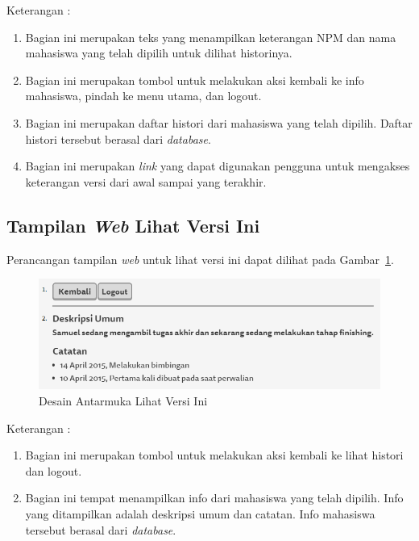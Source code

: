 Keterangan :
\begin{enumerate}[(1)]
\item
Bagian ini merupakan teks yang menampilkan keterangan NPM dan nama mahasiswa yang telah dipilih untuk dilihat historinya.
\item
Bagian ini merupakan tombol untuk melakukan aksi kembali ke info mahasiswa, pindah ke menu utama, dan logout.
\item
Bagian ini merupakan daftar histori dari mahasiswa yang telah dipilih. Daftar histori tersebut berasal dari {\it database}.
\item
Bagian ini merupakan {\it link} yang dapat digunakan pengguna untuk mengakses keterangan versi dari awal sampai yang terakhir.
\end{enumerate}

\subsection{Tampilan {\it Web} Lihat Versi Ini}
Perancangan tampilan {\it web} untuk lihat versi ini dapat dilihat pada
Gambar~\ref{fig:lihatversiini}.
\begin{figure}[ht]
\centering
\includegraphics[scale=0.8]{Gambar/lihatversiini.png}
\caption[Desain Antarmuka Lihat Versi Ini]{Desain Antarmuka Lihat Versi Ini}
\label{fig:lihatversiini}
\end{figure}

Keterangan :
\begin{enumerate}[(1)]
\item
Bagian ini merupakan tombol untuk melakukan aksi kembali ke lihat histori dan logout.	
\item
Bagian ini tempat menampilkan info dari mahasiswa yang telah dipilih. Info yang ditampilkan adalah deskripsi umum dan catatan. Info mahasiswa tersebut berasal dari {\it database}.
\end{enumerate}

